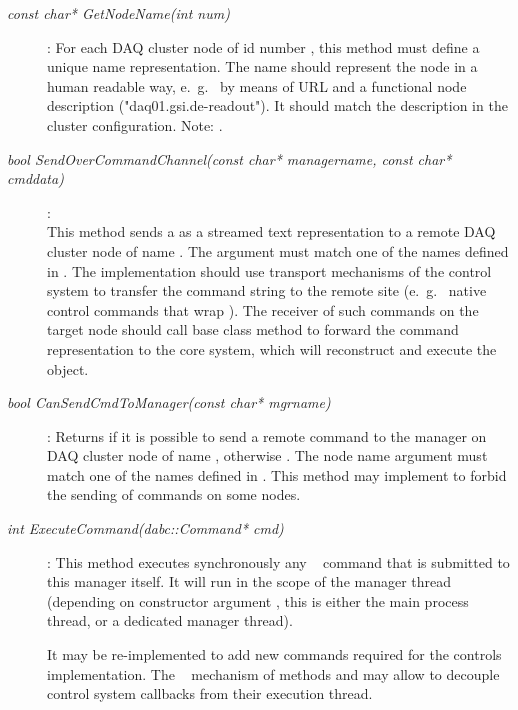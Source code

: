 \begin{description}
\item[\em const char* GetNodeName(int num)] :
For each DAQ cluster node of id number ,
this method must define a unique name representation. 
The name should represent the node in a human readable
way, e.~g.~ by means of URL and a functional node description
("daq01.gsi.de-readout"). It should match the
description in the cluster configuration.
Note: .



\item[\em bool SendOverCommandChannel(const char* managername, const char* cmddata)] :
 \\
This method sends a  as a streamed text representation 
to a remote DAQ cluster node of name .
The  argument must match one of the names defined in
. The implementation should use
transport mechanisms of the control system to transfer the
command string to the remote site 
(e.~g.~ native control commands that wrap ).
The receiver of such commands on the target node
should call base class method
 to 
forward the command representation to the core system,
which will reconstruct and execute the  object. 

 
\item[\em bool CanSendCmdToManager(const char* mgrname)] :
Returns  if it is possible to send a remote
command to the manager on DAQ cluster node of name ,
otherwise . 
The node name argument must match one of the names defined in
.
This method may implement to forbid the sending of commands on some nodes.


\item[\em int ExecuteCommand(dabc::Command* cmd)] :
This method executes synchronously any
\dabc~ command that is submitted to this manager itself.
It will run in the scope of the manager thread
(depending on constructor argument , 
this is either the main process thread, or a dedicated manager thread).

It may be re-implemented to add new commands required for the
controls implementation. The \dabc~ mechanism of
methods  and  may allow
to decouple control system callbacks from their execution thread.

 
\end{description}


